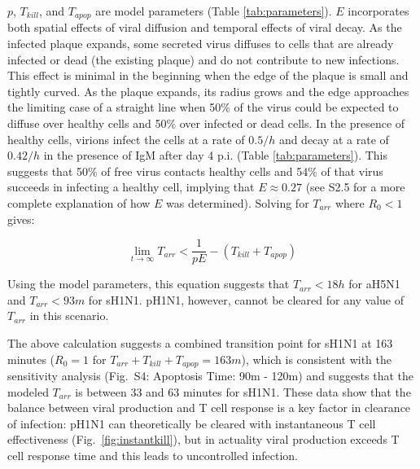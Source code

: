 \documentclass[preprint,10pt,numbers]{elsarticle}
\begin{document}

$p$, $T_{kill}$, and $T_{apop}$ are model parameters (Table \ref{tab:parameters}).  $E$ incorporates both spatial effects of viral diffusion and temporal effects of viral decay.  As the infected plaque expands, some secreted virus diffuses to cells that are already infected or dead (the existing plaque) and do not contribute to new infections.  This effect is minimal in the beginning when the edge of the plaque is small and tightly curved.  As the plaque expands, its radius grows and the edge approaches the limiting case of a straight line when 50\% of the virus could be expected to diffuse over healthy cells and 50\% over infected or dead cells.  In the presence of healthy cells, virions infect the cells at a rate of $0.5/h$ and decay at a rate of $0.42/h$ in the presence of IgM after day 4 p.i.  (Table \ref{tab:parameters}).  This suggests that 50\% of free virus contacts healthy cells and 54\% of that virus succeeds in infecting a healthy cell, implying that $E \approx 0.27$ (see S2.5 for a more complete explanation of how $E$ was determined).  Solving for $T_{arr}$ where $R_0 < 1$ gives:

\begin{equation*}
\lim_{t \to \infty} T_{arr} < \frac{1}{pE} - (T_{kill} + T_{apop})
\tag{Eq. 4}
\end{equation*}

Using the model parameters, this equation suggests that $T_{arr} < 18h$ for aH5N1 and $T_{arr} < 93m$ for sH1N1.  pH1N1, however, cannot be cleared for any value of $T_{arr}$ in this scenario.  

The above calculation suggests a combined transition point for sH1N1 at 163 minutes ($R_0 = 1$ for $T_{arr}+T_{kill}+T_{apop}=163m$), which is consistent with the sensitivity analysis (Fig.~S4: Apoptosis Time: 90m - 120m) and suggests that the modeled $T_{arr}$ is between 33 and 63 minutes for sH1N1.  These data show that the balance between viral production and T cell response is a key factor in clearance of infection: pH1N1 can theoretically be cleared with instantaneous T cell effectiveness (Fig.~\ref{fig:instantkill}), but in actuality viral production exceeds T cell response time and this leads to uncontrolled infection.
\end{document}
